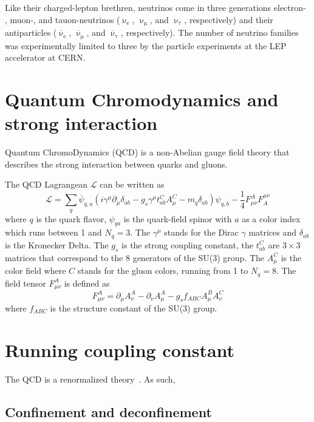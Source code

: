 Like their charged-lepton brethren, neutrinos come in three generations electron- , muon-, and tauon-neutrinos ($\upnu_\mathrm{e}$, $\upnu_\upmu$, and $\upnu_\uptau$, respectively) and their antiparticles ($\overline{\upnu}_\mathrm{e}$, $\overline{\upnu}_\upmu$, and $\overline{\upnu}_\uptau$, respectively). The number of neutrino families was experimentally limited to three by the particle experiments at the LEP accelerator at CERN\@.

\section{Quantum Chromodynamics and strong interaction}


Quantum ChromoDynamics (QCD) is a non-Abelian gauge field theory that describes the strong interaction between quarks and gluons.

The QCD Lagrangean $\mathcal{L}$ can be written as
\begin{equation}
 \mathcal{L} = \sum_{q}\overline{\psi}_{q,a}(i\gamma^\mu \partial_\mu \delta_{ab} - g_s \gamma^\mu t_{ab}^CA_\mu^C - m_q\delta_{ab})\psi_{q,b} - \frac{1}{4}F_{\mu\nu}^AF^{\mu\nu}_A
\end{equation}
where $q$ is the quark flavor, $\psi_{qa}$ is the quark-field spinor with $a$ as a color index which runs between 1 and $N_q = 3$\@. The $\gamma^\mu$ stands for the Dirac $\gamma$ matrices and $\delta_{ab}$ is the Kronecker Delta. The $g_s$ is the strong coupling constant, the $t_{ab}^C$ are $3\times3$ matrices that correspond to the 8 generators of the SU(3) group. The $A_\mu^C$ is the color field where $C$ stands for the gluon colors, running from 1 to $N_q=8$\@. The field tensor $F^A_{\mu\nu}$ is defined as
\begin{equation}
 F_{\mu\nu}^A = \partial_\mu A^A_\nu - \partial_\nu A^A_\mu - g_s f_{ABC} A^B_\mu A_\nu^C
\end{equation}
where $f_{ABC}$ is the structure constant of the SU(3) group.

\section{Running coupling constant}
The QCD is a renormalized theory~\cite{renormalizationTHOOFT,renormalizationBOLLINI}\@. As such, 


\subsection{Confinement and deconfinement}

